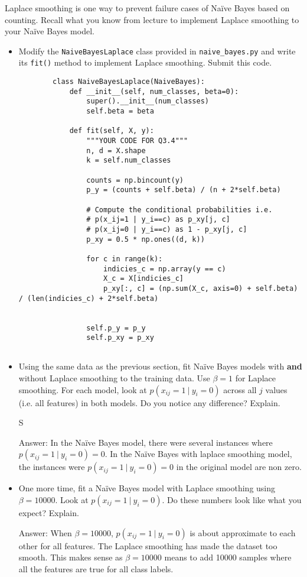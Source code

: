\documentclass{article}
\newcommand{\blu}[1]{{\textcolor{blu}{#1}}}
\newcommand{\gre}[1]{\textcolor{gre}{#1}}
\newcommand\ans[1]{\par\gre{Answer: #1}}
\let\ask\blu
\begin{document}
    Laplace smoothing is one way to prevent failure cases of Na\"ive Bayes based on counting. Recall what you know from lecture to implement Laplace smoothing to your Na\"ive Bayes model.
    \begin{itemize}
        \item Modify the \texttt{NaiveBayesLaplace} class provided in \texttt{naive\_bayes.py} and write its \texttt{fit()} method to implement Laplace smoothing. \ask{Submit this code.}
        \begin{verbatim}
        class NaiveBayesLaplace(NaiveBayes):
            def __init__(self, num_classes, beta=0):
                super().__init__(num_classes)
                self.beta = beta
        
            def fit(self, X, y):
                """YOUR CODE FOR Q3.4"""
                n, d = X.shape
                k = self.num_classes
        
                counts = np.bincount(y)
                p_y = (counts + self.beta) / (n + 2*self.beta)
        
                # Compute the conditional probabilities i.e.
                # p(x_ij=1 | y_i==c) as p_xy[j, c]
                # p(x_ij=0 | y_i==c) as 1 - p_xy[j, c]
                p_xy = 0.5 * np.ones((d, k)) 
                
                for c in range(k):
                    indicies_c = np.array(y == c)
                    X_c = X[indicies_c]
                    p_xy[:, c] = (np.sum(X_c, axis=0) + self.beta) / (len(indicies_c) + 2*self.beta)
        
        
                self.p_y = p_y
                self.p_xy = p_xy
        
        \end{verbatim}
        \item Using the same data as the previous section, fit Na\"ive Bayes models with \textbf{and} without Laplace smoothing to the training data. Use $\beta=1$ for Laplace smoothing. For each model, look at $p(x_{ij} = 1 \ | \ y_i = 0)$ across all $j$ values (i.e. all features) in both models. \ask{Do you notice any difference? Explain.}
        
        S\ans{ In the Na\"ive Bayes model, there were several instances where $p(x_{ij} = 1 \ | \ y_i = 0) = 0$. In the Na\"ive Bayes with laplace smoothing model, the instances were $p(x_{ij} = 1 \ | \ y_i = 0) = 0$ in the original model are non zero. }
        
        \item One more time, fit a Na\"ive Bayes model with Laplace smoothing using $\beta=10000$. Look at $p(x_{ij} = 1 \ | \ y_i = 0)$. \ask{Do these numbers look like what you expect? Explain.}
        
        \ans{ When $\beta=10000$, $p(x_{ij} = 1 \ | \ y_i = 0)$ is about approximate to each other for all features. The Laplace smoothing has made the dataset too smooth. This makes sense as $\beta=10000$ means to add 10000 samples where all the features are true for all class labels.}
    \end{itemize}
\end{document}
